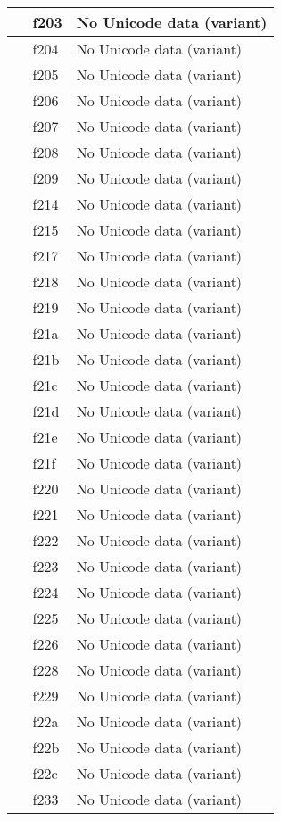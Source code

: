 \documentclass[12pt,letterpaper,openany]{book}
\begin{document}
\begin{center}
\begin{supertabular}{|m{0.25in}|m{0.5in}|m{4in}|}
 & f203 & No Unicode data (variant)\\\hline
 & f204 & No Unicode data (variant)\\\hline
 & f205 & No Unicode data (variant)\\\hline
 & f206 & No Unicode data (variant)\\\hline
 & f207 & No Unicode data (variant)\\\hline
 & f208 & No Unicode data (variant)\\\hline
 & f209 & No Unicode data (variant)\\\hline
 & f214 & No Unicode data (variant)\\\hline
 & f215 & No Unicode data (variant)\\\hline
 & f217 & No Unicode data (variant)\\\hline
 & f218 & No Unicode data (variant)\\\hline
 & f219 & No Unicode data (variant)\\\hline
 & f21a & No Unicode data (variant)\\\hline
 & f21b & No Unicode data (variant)\\\hline
 & f21c & No Unicode data (variant)\\\hline
 & f21d & No Unicode data (variant)\\\hline
 & f21e & No Unicode data (variant)\\\hline
 & f21f & No Unicode data (variant)\\\hline
 & f220 & No Unicode data (variant)\\\hline
 & f221 & No Unicode data (variant)\\\hline
 & f222 & No Unicode data (variant)\\\hline
 & f223 & No Unicode data (variant)\\\hline
 & f224 & No Unicode data (variant)\\\hline
 & f225 & No Unicode data (variant)\\\hline
 & f226 & No Unicode data (variant)\\\hline
 & f228 & No Unicode data (variant)\\\hline
 & f229 & No Unicode data (variant)\\\hline
 & f22a & No Unicode data (variant)\\\hline
 & f22b & No Unicode data (variant)\\\hline
 & f22c & No Unicode data (variant)\\\hline
 & f233 & No Unicode data (variant)\\\hline

\end{supertabular}
\end{center}
\end{document}
